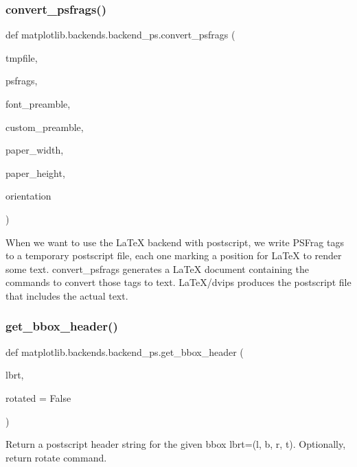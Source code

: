 \subsubsection{\texorpdfstring{convert\+\_\+psfrags()}{convert\_psfrags()}}
{\footnotesize\ttfamily def matplotlib.\+backends.\+backend\+\_\+ps.\+convert\+\_\+psfrags (\begin{DoxyParamCaption}\item[{}]{tmpfile,  }\item[{}]{psfrags,  }\item[{}]{font\+\_\+preamble,  }\item[{}]{custom\+\_\+preamble,  }\item[{}]{paper\+\_\+width,  }\item[{}]{paper\+\_\+height,  }\item[{}]{orientation }\end{DoxyParamCaption})}

\begin{DoxyVerb}When we want to use the LaTeX backend with postscript, we write PSFrag tags
to a temporary postscript file, each one marking a position for LaTeX to
render some text. convert_psfrags generates a LaTeX document containing the
commands to convert those tags to text. LaTeX/dvips produces the postscript
file that includes the actual text.
\end{DoxyVerb}
 \mbox{\label{namespacematplotlib_1_1backends_1_1backend__ps_a0f26fb55b593a427cc527b17be0e1c9d}} 
\subsubsection{\texorpdfstring{get\+\_\+bbox\+\_\+header()}{get\_bbox\_header()}}
{\footnotesize\ttfamily def matplotlib.\+backends.\+backend\+\_\+ps.\+get\+\_\+bbox\+\_\+header (\begin{DoxyParamCaption}\item[{}]{lbrt,  }\item[{}]{rotated = {\ttfamily False} }\end{DoxyParamCaption})}

\begin{DoxyVerb}Return a postscript header string for the given bbox lbrt=(l, b, r, t).
Optionally, return rotate command.
\end{DoxyVerb}
 \mbox{\label{namespacematplotlib_1_1backends_1_1backend__ps_aa073edde5521a77fbc430126ea9ec543}} 
